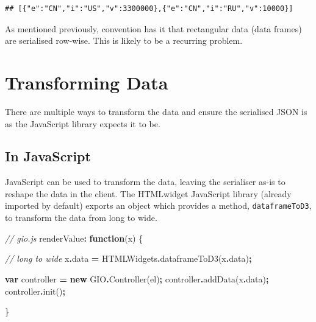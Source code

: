 \documentclass[
]{krantz}
\makeatletter
\newenvironment{Shaded}{\begin{snugshade}}{\end{snugshade}}
\newcommand{\AttributeTok}[1]{\textcolor[rgb]{0.61,0.61,0.61}{#1}}
\newcommand{\CommentTok}[1]{\textcolor[rgb]{0.37,0.37,0.37}{\textit{#1}}}
\newcommand{\FunctionTok}[1]{\textcolor[rgb]{0,0,0}{#1}}
\newcommand{\KeywordTok}[1]{\textcolor[rgb]{0.27,0.27,0.27}{\textbf{#1}}}
\newcommand{\NormalTok}[1]{#1}
\newcommand{\OperatorTok}[1]{\textcolor[rgb]{0.43,0.43,0.43}{\textbf{#1}}}
\newenvironment{kframe}{%
\medskip{}
\setlength{\fboxsep}{.8em}
 \def\at@end@of@kframe{}%
 \ifinner\ifhmode%
  \def\at@end@of@kframe{\end{minipage}}%
  \begin{minipage}{\columnwidth}%
 \fi\fi%
 \def\FrameCommand##1{\hskip\@totalleftmargin \hskip-\fboxsep
 \colorbox{shadecolor}{##1}\hskip-\fboxsep
     \hskip-\linewidth \hskip-\@totalleftmargin \hskip\columnwidth}%
 \MakeFramed {\advance\hsize-\width
   \@totalleftmargin\z@ \linewidth\hsize
   \@setminipage}}%
 {\par\unskip\endMakeFramed%
 \at@end@of@kframe}
\renewenvironment{Shaded}{\begin{kframe}}{\end{kframe}}
\makeatother
\begin{document}
\begin{verbatim}
## [{"e":"CN","i":"US","v":3300000},{"e":"CN","i":"RU","v":10000}]
\end{verbatim}

As mentioned previously, convention has it that rectangular data (data frames) are serialised row-wise. This is likely to be a recurring problem.

\hypertarget{transforming-data}{%
\section*{Transforming Data}\label{transforming-data}}


There are multiple ways to transform the data and ensure the serialised JSON is as the JavaScript library expects it to be.

\hypertarget{in-javascript}{%
\subsection*{In JavaScript}\label{in-javascript}}


JavaScript can be used to transform the data, leaving the serialiser as-is to reshape the data in the client. The HTMLwidget JavaScript library (already imported by default) exports an object which provides a method, \texttt{dataframeToD3}, to transform the data from long to wide.

\begin{Shaded}
\begin{Highlighting}[]
\CommentTok{// gio.js}
\NormalTok{renderValue}\OperatorTok{:} \KeywordTok{function}\NormalTok{(x) \{}

  \CommentTok{// long to wide}
\NormalTok{  x}\OperatorTok{.}\AttributeTok{data} \OperatorTok{=}\NormalTok{ HTMLWidgets}\OperatorTok{.}\FunctionTok{dataframeToD3}\NormalTok{(x}\OperatorTok{.}\AttributeTok{data}\NormalTok{)}\OperatorTok{;}

  \KeywordTok{var}\NormalTok{ controller }\OperatorTok{=} \KeywordTok{new}\NormalTok{ GIO}\OperatorTok{.}\FunctionTok{Controller}\NormalTok{(el)}\OperatorTok{;}
\NormalTok{  controller}\OperatorTok{.}\FunctionTok{addData}\NormalTok{(x}\OperatorTok{.}\AttributeTok{data}\NormalTok{)}\OperatorTok{;} 
\NormalTok{  controller}\OperatorTok{.}\FunctionTok{init}\NormalTok{()}\OperatorTok{;}

\NormalTok{\}}
\end{Highlighting}
\end{Shaded}
\end{document}

